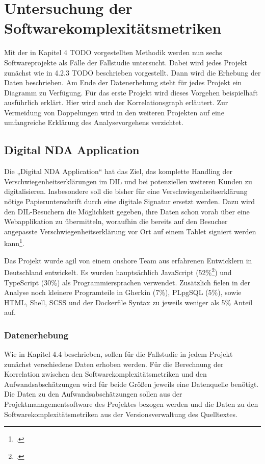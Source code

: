 \chapter{Untersuchung der Softwarekomplexitätsmetriken}\label{untersuchung-der-softwarekomplexituxe4tsmetriken}

Mit der in Kapitel 4 TODO vorgestellten Methodik werden nun sechs
Softwareprojekte als Fälle der Fallstudie untersucht. Dabei wird jedes
Projekt zunächst wie in 4.2.3 TODO beschrieben vorgestellt. Dann wird die
Erhebung der Daten beschrieben. Am Ende der Datenerhebung steht für
jedes Projekt ein Diagramm zu Verfügung. Für das erste Projekt wird
dieses Vorgehen beispielhaft ausführlich erklärt. Hier wird auch der
Korrelationsgraph erläutert. Zur Vermeidung von Doppelungen wird in den
weiteren Projekten auf eine umfangreiche Erklärung des Analysevorgehens
verzichtet.

\section{Digital NDA Application}\label{digital-nda-application}

Die „Digital NDA Application`` hat das Ziel, das komplette Handling der
Verschwiegenheitserklärungen im DIL und bei potenziellen weiteren Kunden
zu digitalisieren. Insbesondere soll die bisher für eine
Verschwiegenheitserklärung nötige Papierunterschrift durch eine digitale
Signatur ersetzt werden. Dazu wird den DIL-Besuchern die Möglichkeit
gegeben, ihre Daten schon vorab über eine Webapplikation zu übermitteln,
woraufhin die bereits auf den Besucher angepasste
Verschwiegenheitserklärung vor Ort auf einem Tablet signiert werden
kann\footcite[Vgl. ][]{Unternehmensinterne Quelle}.

Das Projekt wurde agil von einem onshore Team aus erfahrenen Entwicklern
in Deutschland entwickelt. Es wurden hauptsächlich JavaScript
(52\%\footcite[Vgl. ][]{Quelle Complexity report anhang}) und TypeScript (30\%)
als Programmiersprachen verwendet. Zusätzlich fielen in der Analyse noch
kleinere Programteile in Gherkin (7\%), PLpgSQL (5\%), sowie HTML,
Shell, SCSS und der Dockerfile Syntax zu jeweils weniger als 5\% Anteil
auf.

\subsection{Datenerhebung}\label{Datenerhebung}

Wie in Kapitel 4.4 beschrieben, sollen für die Fallstudie in jedem
Projekt zunächst verschiedene Daten erhoben werden. Für die Berechnung
der Korrelation zwischen den Softwarekomplexitätsmetriken und den
Aufwandsabschätzungen wird für beide Größen jeweils eine Datenquelle
benötigt. Die Daten zu den Aufwandsabschätzungen sollen aus der
Projektmanagementsoftware des Projektes bezogen werden und die Daten zu
den Softwarekomplexitätsmetriken aus der Versionsverwaltung des
Quelltextes.

